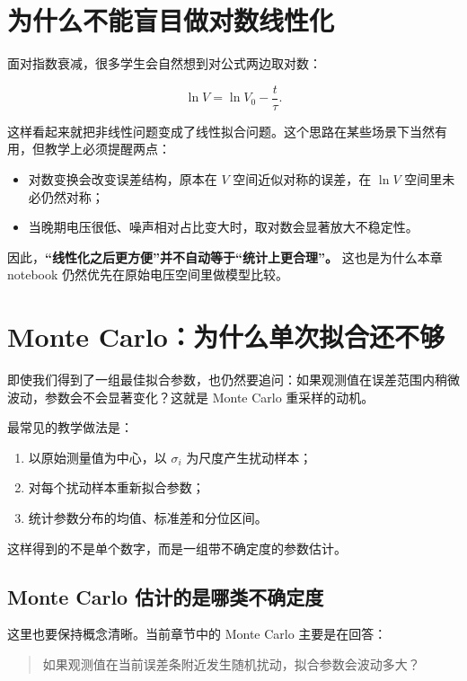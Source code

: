 \section{为什么不能盲目做对数线性化}

面对指数衰减，很多学生会自然想到对公式两边取对数：

\[
\ln V = \ln V_0 - \frac{t}{\tau}.
\]

这样看起来就把非线性问题变成了线性拟合问题。这个思路在某些场景下当然有用，但教学上必须提醒两点：

\begin{itemize}
    \item 对数变换会改变误差结构，原本在 $V$ 空间近似对称的误差，在 $\ln V$ 空间里未必仍然对称；
    \item 当晚期电压很低、噪声相对占比变大时，取对数会显著放大不稳定性。
\end{itemize}

因此，\textbf{“线性化之后更方便”并不自动等于“统计上更合理”。} 这也是为什么本章 notebook 仍然优先在原始电压空间里做模型比较。

\section{Monte Carlo：为什么单次拟合还不够}

即使我们得到了一组最佳拟合参数，也仍然要追问：如果观测值在误差范围内稍微波动，参数会不会显著变化？这就是 Monte Carlo 重采样的动机。

最常见的教学做法是：

\begin{enumerate}
    \item 以原始测量值为中心，以 $\sigma_i$ 为尺度产生扰动样本；
    \item 对每个扰动样本重新拟合参数；
    \item 统计参数分布的均值、标准差和分位区间。
\end{enumerate}

这样得到的不是单个数字，而是一组带不确定度的参数估计。

\subsection{Monte Carlo 估计的是哪类不确定度}

这里也要保持概念清晰。当前章节中的 Monte Carlo 主要是在回答：

\begin{quote}
如果观测值在当前误差条附近发生随机扰动，拟合参数会波动多大？
\end{quote}

